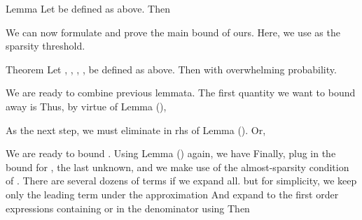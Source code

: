 \Result
{Lemma}
{
Let  be defined as above.
Then
%
%
}

\startsection [title={The Main Bound}]

We can now formulate and prove the main bound of ours.
Here, we use  as the sparsity threshold.

\Result
{Theorem}
{
Let , , , ,  be defined as above.
Then
with overwhelming probability.
}

We are ready to combine previous lemmata.
The first quantity we want to bound away is
Thus, by virtue of Lemma (),

As the next step, we must eliminate  in rhs of Lemma ().
Or,

We are ready to bound .
Using Lemma () again, we have
Finally, plug in the bound for , the last unknown, and we make use of the almost-sparsity condition of .
There are several dozens of terms if we expand all.
but for simplicity, we keep only the leading term under the approximation
And expand to the first order expressions containing  or  in the denominator using
Then


\color[red]{(To be done)}

\stopchapter
